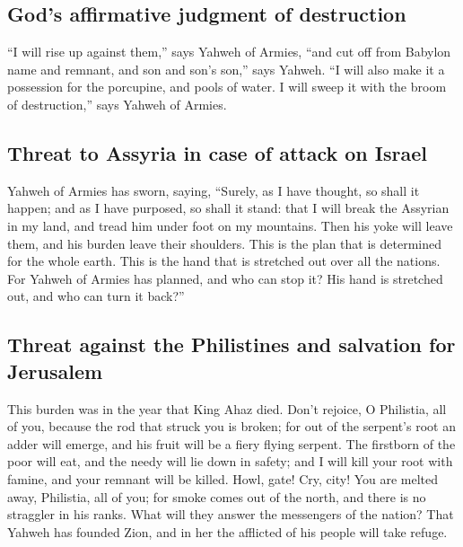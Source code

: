 \hypertarget{gods-affirmative-judgment-of-destruction}{%
\subsection{God's affirmative judgment of
destruction}\label{gods-affirmative-judgment-of-destruction}}

 ``I will rise up against them,'' says Yahweh of Armies,
``and cut off from Babylon name and remnant, and son and son's son,''
says Yahweh.  ``I will also make it a possession for the
porcupine, and pools of water. I will sweep it with the broom of
destruction,'' says Yahweh of Armies.

\hypertarget{threat-to-assyria-in-case-of-attack-on-israel}{%
\subsection{Threat to Assyria in case of attack on
Israel}\label{threat-to-assyria-in-case-of-attack-on-israel}}

 Yahweh of Armies has sworn, saying, ``Surely, as I have
thought, so shall it happen; and as I have purposed, so shall it stand:
 that I will break the Assyrian in my land, and tread him
under foot on my mountains. Then his yoke will leave them, and his
burden leave their shoulders.  This is the plan that is
determined for the whole earth. This is the hand that is stretched out
over all the nations.  For Yahweh of Armies has planned,
and who can stop it? His hand is stretched out, and who can turn it
back?''

\hypertarget{threat-against-the-philistines-and-salvation-for-jerusalem}{%
\subsection{Threat against the Philistines and salvation for
Jerusalem}\label{threat-against-the-philistines-and-salvation-for-jerusalem}}

 This burden was in the year that King Ahaz died.
 Don't rejoice, O Philistia, all of you, because the rod
that struck you is broken; for out of the serpent's root an adder will
emerge, and his fruit will be a fiery flying serpent. 
The firstborn of the poor will eat, and the needy will lie down in
safety; and I will kill your root with famine, and your remnant will be
killed.  Howl, gate! Cry, city! You are melted away,
Philistia, all of you; for smoke comes out of the north, and there is no
straggler in his ranks.  What will they answer the
messengers of the nation? That Yahweh has founded Zion, and in her the
afflicted of his people will take refuge.

